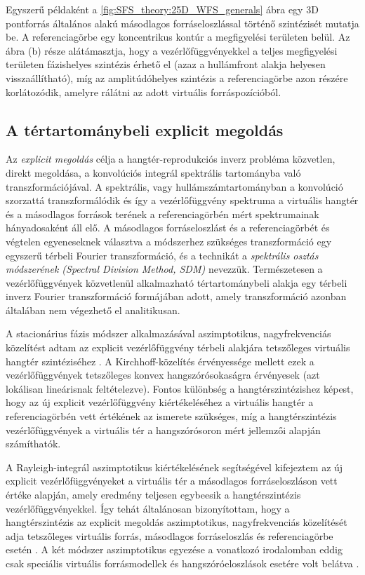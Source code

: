 \documentclass[10pt,twoside]{article}
\theoremstyle{thesisgroupstyle}
\theoremstyle{indented}
\begin{document}
Egyszerű példaként a \ref{fig:SFS_theory:25D_WFS_generals} ábra egy 3D pontforrás általános alakú másodlagos forráseloszlással történő szintézisét mutatja be.
A referenciagörbe egy koncentrikus kontúr a megfigyelési területen belül.
Az ábra (b) része alátámasztja, hogy a vezérlőfüggvényekkel a teljes megfigyelési területen fázishelyes szintézis érhető el (azaz a hullámfront alakja helyesen visszaállítható), míg az amplitúdóhelyes szintézis a referenciagörbe azon részére korlátozódik, amelyre rálátni az adott virtuális forráspozícióból.

\subsection{A tértartománybeli explicit megoldás}

Az \emph{explicit megoldás} célja a hangtér-reprodukciós inverz probléma közvetlen, direkt megoldása, a konvolúciós integrál spektrális tartományba való transzformációjával.
A spektrális, vagy hullámszámtartományban a konvolúció szorzattá transzformálódik és így a vezérlőfüggvény spektruma a virtuális hangtér és a másodlagos források terének a referenciagörbén mért spektrumainak hányadosaként áll elő.
A másodlagos forráseloszlást és a referenciagörbét és végtelen egyeneseknek választva a módszerhez szükséges transzformáció egy egyszerű térbeli Fourier transzformáció, és a technikát a \emph{spektrális osztás módszerének (Spectral Division Method, SDM)} nevezzük.
Természetesen a vezérlőfüggvények közvetlenül alkalmazható tértartománybeli alakja egy térbeli inverz Fourier transzformáció formájában adott, amely transzformáció azonban általában nem végezhető el analitikusan.

A stacionárius fázis módszer alkalmazásával aszimptotikus, nagyfrekvenciás közelítést adtam az explicit vezérlőfüggvény térbeli alakjára tetszőleges virtuális hangtér szintéziséhez \cite{Firtha2017:daga_booklet}.
A Kirchhoff-közelítés érvényessége mellett ezek a vezérlőfüggvények tetszőleges konvex hangszórósokaságra érvényesek (azt lokálisan lineárisnak feltételezve).
Fontos különbség a hangtérszintézishez képest, hogy az új explicit vezérlőfüggvény kiértékeléséhez a virtuális hangtér a referenciagörbén vett értékének az ismerete szükséges, míg a hangtérszintézis vezérlőfüggvények a virtuális tér a hangszórósoron mért jellemzői alapján számíthatók.

A Rayleigh-integrál aszimptotikus kiértékelésének segítségével kifejeztem az új explicit vezérlőfüggvényeket a virtuális tér a másodlagos forráseloszláson vett értéke alapján, amely eredmény teljesen egybeesik a hangtérszintézis vezérlőfüggvényekkel.
Így tehát általánosan bizonyítottam, hogy a hangtérszintézis az explicit megoldás aszimptotikus, nagyfrekvenciás közelítését adja tetszőleges virtuális forrás, másodlagos forráseloszlás és referenciagörbe esetén \cite{Firtha2018:WFS_vs_SDM_booklet}.
A két módszer aszimptotikus egyezése a vonatkozó irodalomban eddig csak speciális virtuális forrásmodellek és hangszóróeloszlások esetére volt belátva \cite{Schultz2019:HOA_vs_WFS_booklet}.
\end{document}

